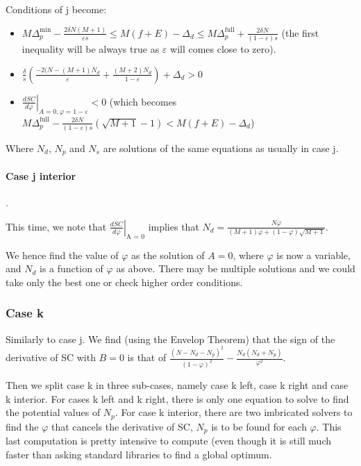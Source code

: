 \documentclass[english, a4paper]{article}
\theoremstyle{plain}
\theoremstyle{definition}
\theoremstyle{remark}
\begin{document}
    Conditions of j become:
    \begin{itemize}
        \item $M \Delta_p^{\text{min}} - \frac{2 \delta N (M+1)}{\varepsilon s} \leq M(f + E) - \Delta_d \leq M\Delta_p^{\text{full}} + \frac{2\delta N}{(1 - \varepsilon) s}$ (the first inequality will be always true as $\varepsilon$ will comes close to zero).
        \item $\frac{\delta}{s} \left(\frac{-2(N - (M + 1)N_d}{\varepsilon} + \frac{(M + 2)N_d}{1 - \varepsilon} \right) + \Delta_d > 0$
        \item $\left. \frac{dSC}{d\varphi}\right|_{A = 0, \varphi = 1 - \varepsilon} < 0$ (which becomes $M\Delta_p^{\text{full}} - \frac{2\delta N}{(1 - \varepsilon) s} (\sqrt{M +1} - 1) <M(f + E) - \Delta_d$)
    \end{itemize}

    Where $N_d$, $N_p$ and $N_s$ are solutions of the same equations as usually in case j.

    \paragraph{Case j interior}.

    This time, we note that $\left. \frac{dSC}{d\varphi}\right|_{\text{A = 0}}$ implies that $N_d = \frac{N\varphi}{(M+ 1)\varphi + (1 - \varphi)\sqrt{M + 1}}$.

    We hence find the value of $\varphi$ as the solution of $A = 0$, where $\varphi$ is now a variable, and $N_d$ is a function of $\varphi$ as above. There may be multiple solutions and we could take only the best one or check higher order conditions.

    \subsubsection{Case k}
    Similarly to case j. We find (using the Envelop Theorem) that the sign of the derivative of SC with $B = 0$ is that of $\frac{(N - N_d - N_p)^2}{(1- \varphi)^2} - \frac{N_d(N_d + N_p)}{\varphi^2}$.

    Then we split case k in three sub-cases, namely case k left, case k right and case k interior. For cases k left and k right, there is only one equation to solve to find the potential values of $N_p$. For case k interior, there are two imbricated solvers to find the $\varphi$ that cancels the derivative of SC, $N_p$ is to be found for each $\varphi$. This last computation is pretty intensive to compute (even though it is still much faster than asking standard libraries to find a global optimum.
\end{document}
